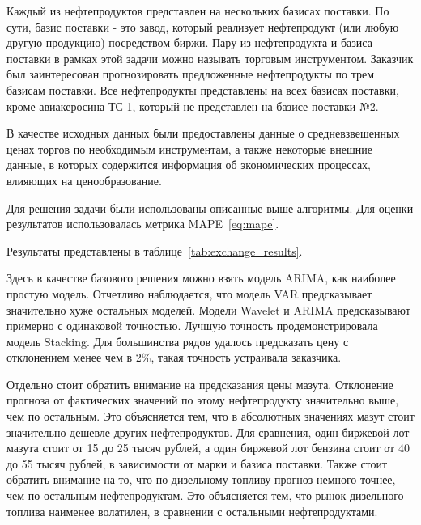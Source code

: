 \documentclass[a4paper,article,14pt]{extarticle}
\begin{document}
Каждый из нефтепродуктов представлен на нескольких базисах поставки.
По сути, базис поставки - это завод, который реализует нефтепродукт (или любую другую продукцию) посредством биржи.
Пару из нефтепродукта и базиса поставки в рамках этой задачи можно называть торговым инструментом.
Заказчик был заинтересован прогнозировать предложенные нефтепродукты по трем базисам поставки.
Все нефтепродукты представлены на всех базисах поставки, кроме авиакеросина ТС-1, который не представлен на базисе поставки №2.

В качестве исходных данных были предоставлены данные о средневзвешенных ценах торгов по необходимым инструментам, а также некоторые внешние данные, в которых содержится информация об экономических процессах, влияющих на ценообразование.


Для решения задачи были использованы описанные выше алгоритмы.
Для оценки результатов использовалась метрика MAPE~\eqref{eq:mape}.

Результаты представлены в таблице~\ref{tab:exchange_results}.

Здесь в качестве базового решения можно взять модель ARIMA, как наиболее простую модель.
Отчетливо наблюдается, что модель VAR предсказывает значительно хуже остальных моделей.
Модели Wavelet и ARIMA предсказывают примерно с одинаковой точностью.
Лучшую точность продемонстрировала модель Stacking.
Для большинства рядов удалось предсказать цену с отклонением менее чем в 2\%, такая точность устраивала заказчика.

Отдельно стоит обратить внимание на предсказания цены мазута.
Отклонение прогноза от фактических значений по этому нефтепродукту значительно выше, чем по остальным.
Это объясняется тем, что в абсолютных значениях мазут стоит значительно дешевле других нефтепродуктов.
Для сравнения, один биржевой лот мазута стоит от 15 до 25 тысяч рублей, а один биржевой лот бензина стоит от 40 до 55 тысяч рублей, в зависимости от марки и базиса поставки.
Также стоит обратить внимание на то, что по дизельному топливу прогноз немного точнее, чем по остальным нефтепродуктам.
Это объясняется тем, что рынок дизельного топлива наименее волатилен, в сравнении с остальными нефтепродуктами.
\end{document}

